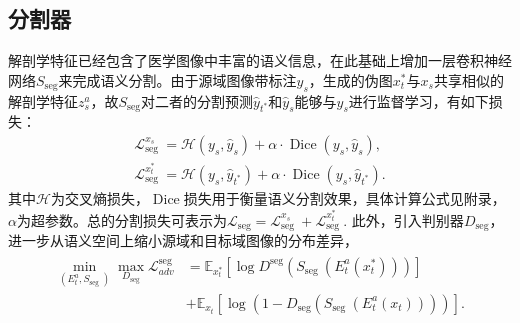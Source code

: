 \subsection{分割器}
解剖学特征已经包含了医学图像中丰富的语义信息，在此基础上增加一层卷积神经网络$S_{\mathrm{seg}}$来完成语义分割。由于源域图像带标注$y_s$，生成的伪图$x_t^*$与$x_s$共享相似的解剖学特征$z_s^a$，故$S_{\mathrm{seg}}$对二者的分割预测$\hat{y}_{t^*}$和$\hat{y}_s$能够与$y_s$进行监督学习，有如下损失：
\begin{align}
    \mathcal{L}_{\text {seg }}^{x_s}=\mathcal{H}\left(y_{s}, \hat{y}_{s}\right)+\alpha \cdot \operatorname{Dice}\left(y_{s}, \hat{y}_{s}\right),\\
    \mathcal{L}_{\text {seg }}^{x_t^*}=\mathcal{H}\left(y_{s}, \hat{y}_{t^*}\right)+\alpha \cdot \operatorname{Dice}\left(y_{s}, \hat{y}_{t^*}\right).
\end{align}
其中$\mathcal{H}$为交叉熵损失，$\operatorname{Dice}$损失用于衡量语义分割效果，具体计算公式见附录，$\alpha$为超参数。总的分割损失可表示为$\mathcal{L}_{\mathrm{seg}} = \mathcal{L}_{\text {seg }}^{x_s} + \mathcal{L}_{\text {seg }}^{x_t^*}.$
此外，引入判别器$D_{\mathrm{seg}}$，进一步从语义空间上缩小源域和目标域图像的分布差异，
\begin{align}
    \begin{aligned}\min _{\left(E_{t}^a, S_{\text {seg }}\right)} \max _{D_{\mathrm{seg}}} \mathcal{L}_{a d v}^{\operatorname{seg}}&=\mathbb{E}_{x_{t}^{*}}\left[\log D^{\mathrm{seg }}\left(S_{\text {seg }}\left(E_{t}^a\left(x_{t}^{*}\right)\right)\right)\right] \\&+\mathbb{E}_{x_{t} }\left[\log \left(1-D_{\mathrm{seg}}\left(S_{\text {seg }}\left(E_{t}^a\left(x_{t}\right)\right)\right)\right)\right] .\end{aligned}
\end{align}

